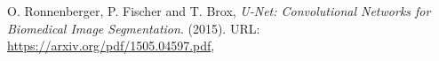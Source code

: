\begin{thebibliography}{3}







O. Ronnenberger, P. Fischer and T. Brox,
\emph{U-Net: Convolutional Networks for Biomedical Image Segmentation}.
(2015).
URL: \url{https://arxiv.org/pdf/1505.04597.pdf},




\end{thebibliography}
\nonfrenchspacing

